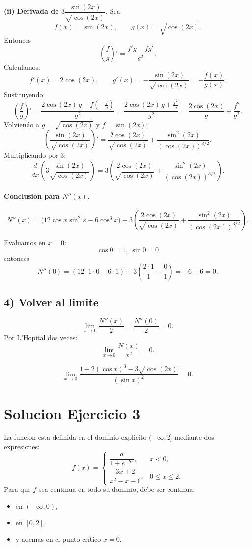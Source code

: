 \documentclass[12pt]{article}
\begin{document}
\textbf{(ii) Derivada de $3\dfrac{\sin(2x)}{\sqrt{\cos(2x)}}$.}
Sea
\[
f(x)=\sin(2x),\qquad g(x)=\sqrt{\cos(2x)}.
\]
Entonces
\[
\left(\frac{f}{g}\right)'=\frac{f'g-fg'}{g^2}.
\]
Calculamos:
\[
f'(x)=2\cos(2x),
\qquad
g'(x)=-\frac{\sin(2x)}{\sqrt{\cos(2x)}}=-\frac{f(x)}{g(x)}.
\]
Sustituyendo:
\[
\left(\frac{f}{g}\right)'
=\frac{2\cos(2x)\,g-f\left(-\frac{f}{g}\right)}{g^2}
=\frac{2\cos(2x)\,g+\frac{f^2}{g}}{g^2}
=\frac{2\cos(2x)}{g}+\frac{f^2}{g^3}.
\]
Volviendo a $g=\sqrt{\cos(2x)}$ y $f=\sin(2x)$:
\[
\left(\frac{\sin(2x)}{\sqrt{\cos(2x)}}\right)'
=\frac{2\cos(2x)}{\sqrt{\cos(2x)}}
+\frac{\sin^2(2x)}{(\cos(2x))^{3/2}}.
\]
Multiplicando por $3$:
\[
\frac{d}{dx}\left(3\frac{\sin(2x)}{\sqrt{\cos(2x)}}\right)
=3\left(
\frac{2\cos(2x)}{\sqrt{\cos(2x)}}
+\frac{\sin^2(2x)}{(\cos(2x))^{3/2}}
\right).
\]

\paragraph{Conclusion para $N''(x)$.}
\[
N''(x)=\bigl(12\cos x\sin^2 x-6\cos^3 x\bigr)
+3\left(
\frac{2\cos(2x)}{\sqrt{\cos(2x)}}
+\frac{\sin^2(2x)}{(\cos(2x))^{3/2}}
\right).
\]

Evaluamos en $x=0$:
\[
\cos 0=1,\ \sin 0=0
\]
entonces
\[
N''(0)=\left(12\cdot 1\cdot 0-6\cdot 1\right)
+3\left(\frac{2\cdot 1}{1}+\frac{0}{1}\right)
=-6+6=0.
\]

\subsection*{4) Volver al limite}
\[
\lim_{x\to 0}\frac{N''(x)}{2}=\frac{N''(0)}{2}=0.
\]
Por L'Hopital dos veces:
\[
\lim_{x\to 0}\frac{N(x)}{x^2}=0.
\]

\[
\boxed{
\lim_{x\to 0}\frac{1+2(\cos x)^3-3\sqrt{\cos(2x)}}{(\sin x)^2}=0.
}
\]

\section*{Solucion Ejercicio 3}

La funcion esta definida en el dominio explicito $(-\infty,2]$ mediante dos expresiones:
\[
f(x)=
\begin{cases}
\dfrac{a}{1+e^{-bx}}, & x<0,\\[6pt]
\dfrac{3x+2}{x^2-x-6}, & 0\le x\le 2.
\end{cases}
\]
Para que $f$ sea continua en todo su dominio, debe ser continua:
\begin{itemize}
\item en $(-\infty,0)$,
\item en $[0,2]$,
\item y ademas en el punto crítico $x=0$.
\end{itemize}
\end{document}
